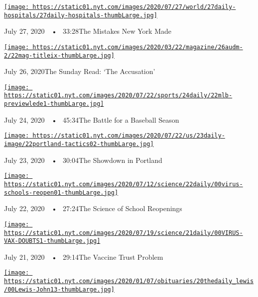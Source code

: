 \href{https://www.nytimes.com/2020/07/27/podcasts/the-daily/new-york-hospitals-covid.html?action=click\&module=audio-series-bar\&region=header\&pgtype=Article}{\texttt{[image: https://static01.nyt.com/images/2020/07/27/world/27daily-hospitals/27daily-hospitals-thumbLarge.jpg]}}

July 27, 2020~~•~ 33:28The Mistakes New York Made

\href{https://www.nytimes.com/2020/07/26/podcasts/the-daily/the-accusation-the-sunday-read.html?action=click\&module=audio-series-bar\&region=header\&pgtype=Article}{\texttt{[image: https://static01.nyt.com/images/2020/03/22/magazine/26audm-2/22mag-titleix-thumbLarge.jpg]}}

July 26, 2020The Sunday Read: `The Accusation'

\href{https://www.nytimes.com/2020/07/24/podcasts/the-daily/mlb-baseball-season-coronavirus.html?action=click\&module=audio-series-bar\&region=header\&pgtype=Article}{\texttt{[image: https://static01.nyt.com/images/2020/07/22/sports/24daily/22mlb-previewlede1-thumbLarge.jpg]}}

July 24, 2020~~•~ 45:34The Battle for a Baseball Season

\href{https://www.nytimes.com/2020/07/23/podcasts/the-daily/portland-protests.html?action=click\&module=audio-series-bar\&region=header\&pgtype=Article}{\texttt{[image: https://static01.nyt.com/images/2020/07/22/us/23daily-image/22portland-tactics02-thumbLarge.jpg]}}

July 23, 2020~~•~ 30:04The Showdown in Portland

\href{https://www.nytimes.com/2020/07/22/podcasts/the-daily/school-reopenings-coronavirus.html?action=click\&module=audio-series-bar\&region=header\&pgtype=Article}{\texttt{[image: https://static01.nyt.com/images/2020/07/12/science/22daily/00virus-schools-reopen01-thumbLarge.jpg]}}

July 22, 2020~~•~ 27:24The Science of School Reopenings

\href{https://www.nytimes.com/2020/07/21/podcasts/the-daily/coronavirus-vaccine.html?action=click\&module=audio-series-bar\&region=header\&pgtype=Article}{\texttt{[image: https://static01.nyt.com/images/2020/07/19/science/21daily/00VIRUS-VAX-DOUBTS1-thumbLarge.jpg]}}

July 21, 2020~~•~ 29:14The Vaccine Trust Problem

\href{https://www.nytimes.com/2020/07/20/podcasts/the-daily/john-lewis.html?action=click\&module=audio-series-bar\&region=header\&pgtype=Article}{\texttt{[image: https://static01.nyt.com/images/2020/01/07/obituaries/20thedaily\_lewis/00Lewis-John13-thumbLarge.jpg]}}

